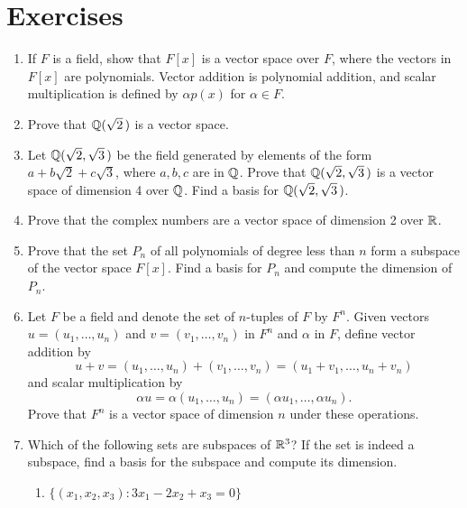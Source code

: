  
\section*{Exercises}
\exrule

 
{\small
\begin{enumerate}

  
\bf\item\rm
If $F$ is a field, show that $F[x]$ is a vector space over $F$, where
the vectors in $F[x]$ are polynomials.  Vector addition is polynomial
addition, and scalar multiplication is defined by $\alpha p(x)$ for
$\alpha \in F$.  

\bf\item\rm
Prove that ${\Bbb Q }( \sqrt{2}\, )$ is a vector space.


\bf\item\rm
Let ${\Bbb Q }( \sqrt{2}, \sqrt{3}\, )$ be the field generated by
elements of the form $a + b \sqrt{2}  + c \sqrt{3}$, where $a, b, c$
are in ${\Bbb Q}$. Prove that ${\Bbb Q }( \sqrt{2}, \sqrt{3}\, )$ is a
vector space of dimension 4 over ${\Bbb Q}$.  Find a basis for 
${\Bbb Q }( \sqrt{2}, \sqrt{3}\, )$.


\bf\item\rm 
Prove that the complex numbers are a vector space of dimension 2
over ${\Bbb R}$. 


\bf\item\rm
Prove that the set $P_n$ of all polynomials of degree less than $n$
form a subspace of the vector space $F[x]$. Find a basis for $P_n$ and
compute the dimension of~$P_n$. 


\bf\item\rm
Let $F$ be a field and denote the set of $n$-tuples of $F$ by $F^n$.
Given vectors $u = (u_1, \ldots, u_n)$ and $v = (v_1, \ldots, v_n)$ in
$F^n$ and $\alpha$ in $F$, define vector addition by
\[
u + v = (u_1, \ldots, u_n) + (v_1, \ldots, v_n)
=
(u_1 + v_1, \ldots, u_n + v_n)
\]
and scalar multiplication by 
\[
\alpha u = \alpha(u_1, \ldots, u_n)= (\alpha u_1, \ldots, \alpha u_n).
\]
Prove that $F^n$ is a vector space of dimension $n$ under these
operations. 


\bf\item\rm
Which of the following sets are subspaces of ${\Bbb R}^3$? If the set
is indeed a subspace, find a basis for the subspace and compute its
dimension.
\begin{enumerate}

  \bf\item\rm
$\{ (x_1, x_2, x_3) : 3 x_1 - 2 x_2 + x_3 = 0 \}$


\end{enumerate}
\end{enumerate}}
